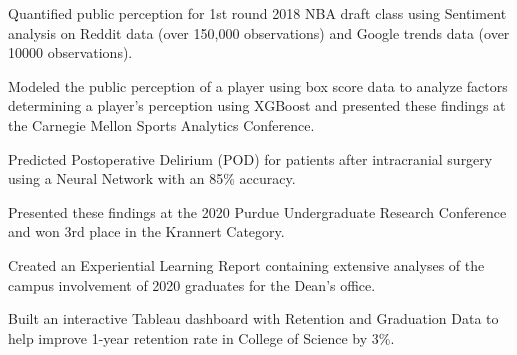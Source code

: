 \documentclass[]{sahana}
\begin{document}
\begin{minipage}[t]{0.66\textwidth}
\vspace{-3pt}
\vspace{-4pt}
\vspace{-8pt}
\noindent
\begin{tightemize}
\item Quantified public perception for 1st round 2018 NBA draft class using Sentiment analysis on Reddit data (over 150,000 observations) and Google trends data (over 10000 observations).
\item Modeled the public perception of a player using box score data to analyze factors determining a player's perception using XGBoost and presented these findings at the Carnegie Mellon Sports Analytics Conference.
\end{tightemize}
\sectionsep
\vspace{-3pt}

\vspace{-4pt}
\vspace{-4pt}
\noindent
\begin{tightemize}
\vspace{-5pt}
\item Predicted Postoperative Delirium (POD) for patients after intracranial surgery using a Neural Network with an 85\% accuracy.
\item Presented these findings at the 2020 Purdue Undergraduate Research Conference and won 3rd place in the Krannert Category.
\end{tightemize}
\sectionsep
\vspace{-3pt}

\vspace{-4pt}
\vspace{-4pt}
\noindent
\begin{tightemize}
\vspace{-6pt}
\item Created an Experiential Learning Report containing extensive analyses of the campus involvement of 2020 graduates for the Dean's office.
\item Built an interactive Tableau dashboard with Retention and Graduation Data to help improve 1-year retention rate in College of Science by 3\%.
\end{tightemize}
\sectionsep
\vspace{-3pt}


\end{minipage}
\end{document}
